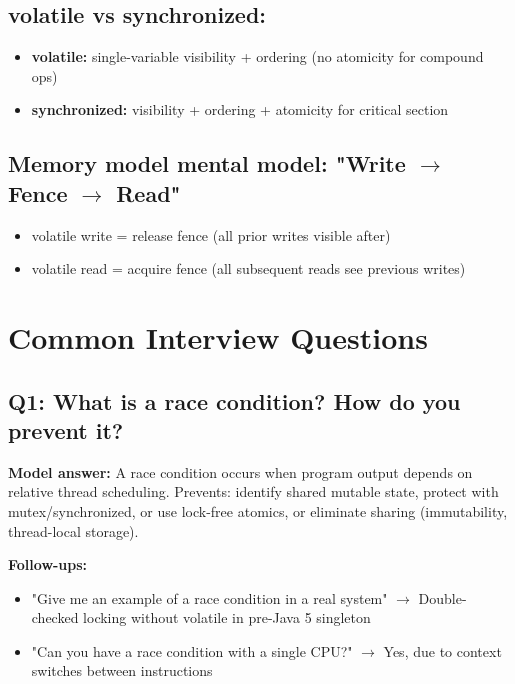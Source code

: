 \documentclass[11pt]{article}
\providecommand{\tightlist}{\setlength{\itemsep}{1pt}\setlength{\parskip}{0pt}}
\begin{document}
\subsection{volatile vs synchronized:}\label{volatile-vs-synchronized}

\begin{itemize}
\tightlist
\item
  \textbf{volatile:} single-variable visibility + ordering (no atomicity for compound ops)
\item
  \textbf{synchronized:} visibility + ordering + atomicity for critical section
\end{itemize}

\subsection{\texorpdfstring{Memory model mental model: \textbf{"Write \(\rightarrow\) Fence \(\rightarrow\) Read"}}{Memory model mental model: "Write \textbackslash rightarrow Fence \textbackslash rightarrow Read"}}\label{memory-model-mental-model-write-rightarrow-fence-rightarrow-read}

\begin{itemize}
\tightlist
\item
  volatile write = release fence (all prior writes visible after)
\item
  volatile read = acquire fence (all subsequent reads see previous writes)
\end{itemize}

\section{Common Interview Questions}\label{common-interview-questions}

\subsection{Q1: What is a race condition? How do you prevent it?}\label{q1-what-is-a-race-condition-how-do-you-prevent-it}

\textbf{Model answer:} A race condition occurs when program output depends on relative thread scheduling. Prevents: identify shared mutable state, protect with mutex/synchronized, or use lock-free atomics, or eliminate sharing (immutability, thread-local storage).

\textbf{Follow-ups:}

\begin{itemize}
\tightlist
\item
  "Give me an example of a race condition in a real system" \(\rightarrow\) Double-checked locking without volatile in pre-Java 5 singleton
\item
  "Can you have a race condition with a single CPU?" \(\rightarrow\) Yes, due to context switches between instructions
\end{itemize}
\end{document}
